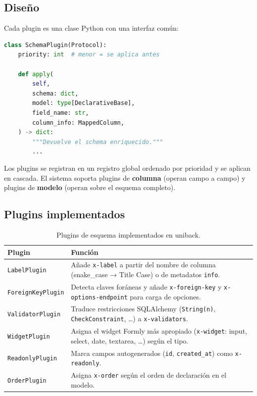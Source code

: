 \subsection{Diseño}
\label{subsec:plugins-diseno}

Cada plugin es una clase Python con una interfaz común:

\begin{lstlisting}[language=Python, caption={Interfaz base de un plugin de esquema.}]
class SchemaPlugin(Protocol):
    priority: int  # menor = se aplica antes

    def apply(
        self,
        schema: dict,
        model: type[DeclarativeBase],
        field_name: str,
        column_info: MappedColumn,
    ) -> dict:
        """Devuelve el schema enriquecido."""
        ...
\end{lstlisting}

Los plugins se registran en un registro global ordenado por prioridad y se aplican en
cascada. El sistema soporta plugins de \textbf{columna} (operan campo a campo) y plugins
de \textbf{modelo} (operan sobre el esquema completo).

\subsection{Plugins implementados}
\label{subsec:plugins-implementados}

\begin{table}[H]
  \centering
  \caption{Plugins de esquema implementados en uniback.}
  \label{tab:plugins}
  \begin{tabular}{lp{9cm}}
    \toprule
    \textbf{Plugin} & \textbf{Función} \\
    \midrule
    \texttt{LabelPlugin} & Añade \texttt{x-label} a partir del nombre de columna
      (snake\_case → Title Case) o de metadatos \texttt{info}. \\
    \texttt{ForeignKeyPlugin} & Detecta claves foráneas y añade
      \texttt{x-foreign-key} y \texttt{x-options-endpoint} para carga de opciones. \\
    \texttt{ValidatorPlugin} & Traduce restricciones SQLAlchemy (\texttt{String(n)},
      \texttt{CheckConstraint}, \ldots) a \texttt{x-validators}. \\
    \texttt{WidgetPlugin} & Asigna el widget Formly más apropiado
      (\texttt{x-widget}: input, select, date, textarea, \ldots) según el tipo. \\
    \texttt{ReadonlyPlugin} & Marca campos autogenerados (\texttt{id}, \texttt{created\_at})
      como \texttt{x-readonly}. \\
    \texttt{OrderPlugin} & Asigna \texttt{x-order} según el orden de declaración en el
      modelo. \\
    \bottomrule
  \end{tabular}
\end{table}

